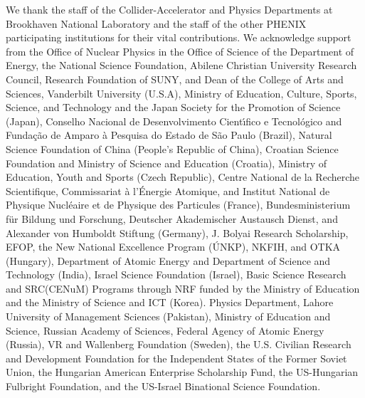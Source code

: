 \documentclass[twocolumn,letterpaper,aps,prc,longbibliography,superscriptaddress,nofootinbib,floatfix]{revtex4-2}
\begin{document}
\begin{acknowledgments}

We thank the staff of the Collider-Accelerator and Physics
Departments at Brookhaven National Laboratory and the staff of
the other PHENIX participating institutions for their vital
contributions.  We acknowledge support from the
Office of Nuclear Physics in the
Office of Science of the Department of Energy,
the National Science Foundation,
Abilene Christian University Research Council,
Research Foundation of SUNY, and
Dean of the College of Arts and Sciences, Vanderbilt University
(U.S.A),
Ministry of Education, Culture, Sports, Science, and Technology
and the Japan Society for the Promotion of Science (Japan),
Conselho Nacional de Desenvolvimento Cient\'{\i}fico e
Tecnol{\'o}gico and Funda\c c{\~a}o de Amparo {\`a} Pesquisa do
Estado de S{\~a}o Paulo (Brazil),
Natural Science Foundation of China (People's Republic of China),
Croatian Science Foundation and
Ministry of Science and Education (Croatia),
Ministry of Education, Youth and Sports (Czech Republic),
Centre National de la Recherche Scientifique, Commissariat
{\`a} l'{\'E}nergie Atomique, and Institut National de Physique
Nucl{\'e}aire et de Physique des Particules (France),
Bundesministerium f\"ur Bildung und Forschung, Deutscher Akademischer
Austausch Dienst, and Alexander von Humboldt Stiftung (Germany),
J. Bolyai Research Scholarship, EFOP, the New National Excellence
Program ({\'U}NKP), NKFIH, and OTKA (Hungary),
Department of Atomic Energy and Department of Science and Technology
(India),
Israel Science Foundation (Israel),
Basic Science Research and SRC(CENuM) Programs through NRF
funded by the Ministry of Education and the Ministry of
Science and ICT (Korea).
Physics Department, Lahore University of Management Sciences (Pakistan),
Ministry of Education and Science, Russian Academy of Sciences,
Federal Agency of Atomic Energy (Russia),
VR and Wallenberg Foundation (Sweden),
the U.S. Civilian Research and Development Foundation for the
Independent States of the Former Soviet Union,
the Hungarian American Enterprise Scholarship Fund,
the US-Hungarian Fulbright Foundation,
and the US-Israel Binational Science Foundation.

\end{acknowledgments}


   
\end{document}
